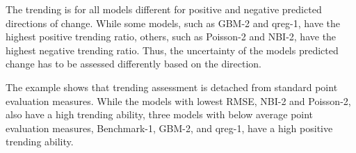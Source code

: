 The trending is for all models different for positive and negative predicted directions of change.
While some models, such as GBM-2 and qreg-1, have the highest positive trending ratio, others, such as Poisson-2 and NBI-2, have the highest negative trending ratio.
Thus, the uncertainty of the models predicted change has to be assessed differently based on the direction.

The example shows that trending assessment is detached from standard point evaluation measures.
While the models with lowest RMSE, NBI-2 and Poisson-2, also have a high trending ability, three models with below average point evaluation measures, Benchmark-1, GBM-2, and qreg-1, have a high positive trending ability.

